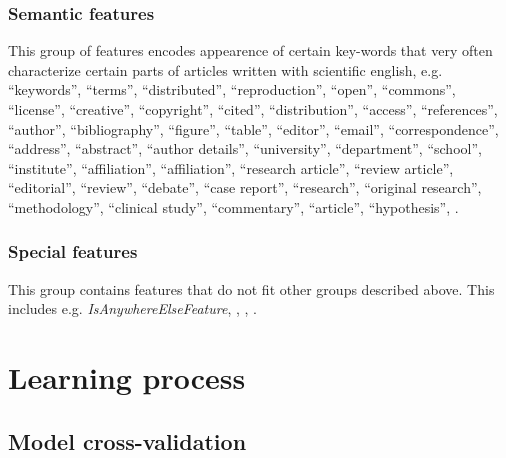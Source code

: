 \subsubsection{Semantic features}
This group of features encodes appearence of certain key-words that very often characterize certain parts of articles written with scientific english, e.g. ``keywords'', ``terms'', ``distributed'', ``reproduction'', ``open'', ``commons'', ``license'', ``creative'', ``copyright'', ``cited'', ``distribution'', ``access'', ``references'', ``author'', ``bibliography'', ``figure'', ``table'', ``editor'', ``email'', ``correspondence'', ``address'', ``abstract'', ``author details'', ``university'', ``department'', ``school'', ``institute'', ``affiliation'', ``affiliation'', ``research article'', ``review article'', ``editorial'', ``review'', ``debate'', ``case report'', ``research'', ``original research'', ``methodology'', ``clinical study'', ``commentary'', ``article'', 
 ``hypothesis'', .
\subsubsection{Special features}
This group contains features that do not fit other groups described above. This includes e.g. \textit{IsAnywhereElseFeature}, , , .

\section{Learning process}
\subsection{Model cross-validation}